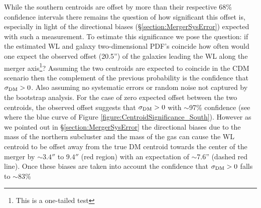 While the southern centroids are offset by more than their respective 68\% confidence intervals there remains the question of how significant this offset is, especially in light of the directional biases (\S\ref{section:MergerSysError}) expected with such a measurement.
To estimate this significance we pose the question:
if the estimated WL and galaxy two-dimensional PDF's coincide how often would one expect the observed offset (20.5'') of the galaxies leading the WL along the merger axis\footnote{This is a one-tailed test}?
Assuming the two centroids are expected to coincide in the CDM scenario then the complement of the previous probability is the confidence that $\sigma_{\rm DM}>0$.
Also assuming no systematic errors or random noise not captured by the bootstrap analysis.
For the case of zero expected offset between the two centroids, the observed offset suggests that $\sigma_{\rm DM}>0$ with $\sim$97\% confidence (see where the blue curve of Figure \ref{figure:CentroidSignificance_South}).
However as we pointed out in \S\ref{section:MergerSysError} the directional biases due to the mass of the northern subcluster and the mass of the gas can cause the WL centroid to be offset away from the true DM centroid towards the center of the merger by $\sim3.4''$ to $9.4''$ (red region) with an expectation of $\sim$7.6'' (dashed red line).
Once these biases are taken into account the confidence that $\sigma_{\rm DM}>0$ falls to $\sim$83\%

